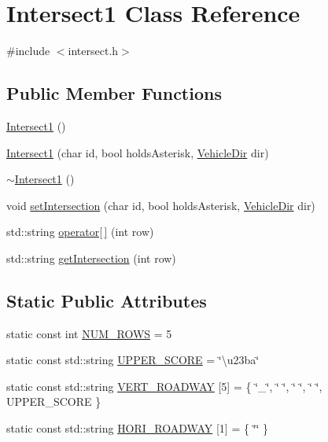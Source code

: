\hypertarget{class_intersect1}{}\section{Intersect1 Class Reference}
\label{class_intersect1}


{\ttfamily \#include $<$intersect.\+h$>$}

\subsection*{Public Member Functions}
\begin{DoxyCompactItemize}
\item 
\hyperlink{class_intersect1_a0c12979886e88742d97abd6589e5df46}{Intersect1} ()
\item 
\hyperlink{class_intersect1_aafc6174c032f9d51a887cb290ae97fdc}{Intersect1} (char id, bool holds\+Asterisk, \hyperlink{vehicle_8h_ab81942edaa6e6c3f12551c3d0e511b85}{Vehicle\+Dir} dir)
\item 
\hyperlink{class_intersect1_a75061672aac2df5e20f6c8d3ead60833}{$\sim$\+Intersect1} ()
\item 
void \hyperlink{class_intersect1_a3433881e13c770732b941f2dbe33ab83}{set\+Intersection} (char id, bool holds\+Asterisk, \hyperlink{vehicle_8h_ab81942edaa6e6c3f12551c3d0e511b85}{Vehicle\+Dir} dir)
\item 
std\+::string \hyperlink{class_intersect1_a8374a2e3221cca364567eec502a0eca0}{operator\mbox{[}$\,$\mbox{]}} (int row)
\item 
std\+::string \hyperlink{class_intersect1_ad81b2fa630cd88de4c9ddf5665d9fda0}{get\+Intersection} (int row)
\end{DoxyCompactItemize}
\subsection*{Static Public Attributes}
\begin{DoxyCompactItemize}
\item 
static const int \hyperlink{class_intersect1_a46247452f9c30930e65b46bea25ba7a0}{N\+U\+M\+\_\+\+R\+O\+WS} = 5
\item 
static const std\+::string \hyperlink{class_intersect1_ac17b41141de97da2a83d278a47a8ea30}{U\+P\+P\+E\+R\+\_\+\+S\+C\+O\+RE} = \char`\"{}\textbackslash{}u23ba\char`\"{}
\item 
static const std\+::string \hyperlink{class_intersect1_abd5133aa7b6fe6959bfb16282c6fcad9}{V\+E\+R\+T\+\_\+\+R\+O\+A\+D\+W\+AY} \mbox{[}5\mbox{]} = \{ \char`\"{}\+\_\+\char`\"{}, \char`\"{} \char`\"{}, \char`\"{} \char`\"{}, \char`\"{} \char`\"{}, U\+P\+P\+E\+R\+\_\+\+S\+C\+O\+RE \}
\item 
static const std\+::string \hyperlink{class_intersect1_a703d1834f8634e9b4a887ef38bfdc1af}{H\+O\+R\+I\+\_\+\+R\+O\+A\+D\+W\+AY} \mbox{[}1\mbox{]} = \{ \char`\"{}\char`\"{} \}
\end{DoxyCompactItemize}
